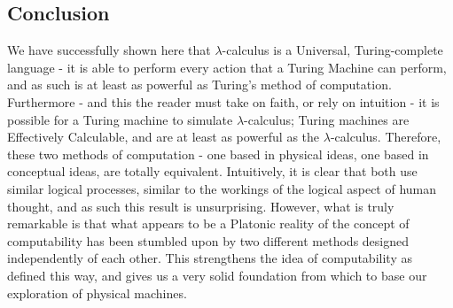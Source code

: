 \documentclass[Master.tex]{subfiles}
\begin{document}
\subsection{Conclusion}

We have successfully shown here that $\lambda$-calculus is a Universal, Turing-complete language - it is able to perform every action that a Turing Machine can perform, and as such is at least as powerful as Turing's method of computation. Furthermore - and this the reader must take on faith, or rely on intuition - it is possible for a Turing machine to simulate $\lambda$-calculus; Turing machines are Effectively Calculable, and are at least as powerful as the $\lambda$-calculus. Therefore, these two methods of computation - one based in physical ideas, one based in conceptual ideas, are totally equivalent. Intuitively, it is clear that both use similar logical processes, similar to the workings of the logical aspect of human thought, and as such this result is unsurprising. However, what is truly remarkable is that what appears to be a Platonic reality of the concept of computability has been stumbled upon by two different methods designed independently of each other. This strengthens the idea of computability as defined this way, and gives us a very solid foundation from which to base our exploration of physical machines.
\end{document}
